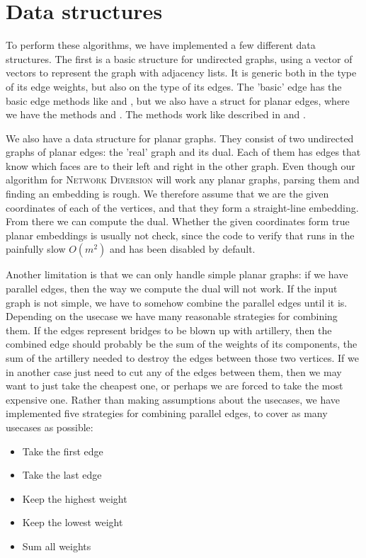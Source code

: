 \section{Data structures}
To perform these algorithms, we have implemented a few different data structures. The first is a basic structure for undirected graphs, using a vector of vectors to represent the graph with adjacency lists. It is generic both in the type of its edge weights, but also on the type of its edges. The 'basic' edge has the basic edge methods like  and , but we also have a struct for planar edges, where we have the methods  and . The methods work like described in  and . 

We also have a data structure for planar graphs. They consist of two undirected graphs of planar edges: the 'real' graph and its dual. Each of them has edges that know which faces are to their left and right in the other graph. Even though our algorithm for \textsc{Network Diversion} will work any planar graphs, parsing them and finding an embedding is rough. We therefore assume that we are the given coordinates of each of the vertices, and that they form a straight-line embedding. From there we can compute the dual. Whether the given coordinates form true planar embeddings is usually not check, since the code to verify that runs in the painfully slow $O(m^2)$ and has been disabled by default.

Another limitation is that we can only handle simple planar graphs: if we have parallel edges, then the way we compute the dual will not work. If the input graph is not simple, we have to somehow combine the parallel edges until it is. Depending on the usecase we have many reasonable strategies for combining them. If the edges represent bridges to be blown up with artillery, then the combined edge should probably be the sum of the weights of its components, the sum of the artillery needed to destroy the edges between those two vertices. If we in another case just need to cut any of the edges between them, then we may want to just take the cheapest one, or perhaps we are forced to take the most expensive one. Rather than making assumptions about the usecases, we have implemented five strategies for combining parallel edges, to cover as many usecases as possible:

\begin{itemize}
    \item Take the first edge
    \item Take the last edge
    \item Keep the highest weight
    \item Keep the lowest weight
    \item Sum all weights
\end{itemize}

